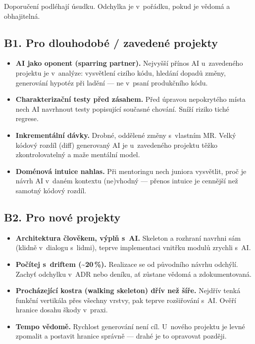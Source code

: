 Doporučení podléhají úsudku.
Odchylka je v~pořádku, pokud je vědomá a obhajitelná.

\subsection{B1. Pro dlouhodobé / zavedené projekty}

\begin{itemize}
\item \textbf{AI jako oponent (sparring partner).}
Nejvyšší přínos AI u~zavedeného projektu je v~analýze: vysvětlení cizího kódu, hledání dopadů změny, generování hypotéz při ladění --- ne v~psaní produkčního kódu.
\item \textbf{Charakterizační testy před zásahem.}
Před úpravou nepokrytého místa nech AI navrhnout testy popisující současné chování.
Sníží riziko tiché regrese.
\item \textbf{Inkrementální dávky.}
Drobné, oddělené změny s~vlastním MR.
Velký kódový rozdíl (diff) generovaný AI je u~zavedeného projektu těžko zkontrolovatelný a maže mentální model.
\item \textbf{Doménová intuice nahlas.}
Při mentoringu nech juniora vysvětlit, proč je návrh AI v~daném kontextu (ne)vhodný --- přenos intuice je cennější než samotný kódový rozdíl.
\end{itemize}

\subsection{B2. Pro nové projekty}

\begin{itemize}
\item \textbf{Architektura člověkem, výplň s~AI.}
Skeleton a rozhraní navrhni sám (klidně v~dialogu s~lidmi), teprve implementaci vnitřku modulů zrychli s~AI.
\item \textbf{Počítej s~driftem (\textasciitilde20\,\%).}
Realizace se od původního návrhu odchýlí.
Zachyť odchylku v~ADR nebo deníku, ať zůstane vědomá a zdokumentovaná.
\item \textbf{Procházející kostra (walking skeleton) dřív než šíře.}
Nejdřív tenká funkční vertikála přes všechny vrstvy, pak teprve rozšiřování s~AI.
Ověří hranice dosahu škody v~praxi.
\item \textbf{Tempo vědomě.}
Rychlost generování není cíl.
U~nového projektu je levné zpomalit a postavit hranice správně --- drahé je to opravovat později.
\end{itemize}

